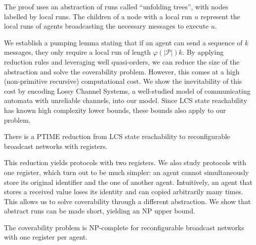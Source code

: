\documentclass{article}
\newcommand{\size}[1]{|#1|}
\newtheorem{lemma}[theorem]{Lemma}
\theoremstyle{definition}
\newtheorem{definition}[theorem]{Definition}
\newtheorem{remark}{Remark}
\begin{document}
The proof uses an abstraction of runs called ``unfolding trees'', with nodes labelled by local runs. The children of a node with a local run $u$ represent the local runs of agents broadcasting the necessary messages to execute $u$.

We establish a pumping lemma stating that if an agent can send a sequence of $k$ messages, they only require a local run of length $\varphi(\size{\mathcal{P}})k$.
By applying reduction rules and leveraging well quasi-orders, we can reduce the size of the abstraction and solve the coverability problem. However, this comes at a high (non-primitive recursive) computational cost. We show the inevitability of this cost by encoding Lossy Channel Systems, a well-studied model of communicating automata with unreliable channels, into our model. Since LCS state reachability has known high complexity lower bounds, these bounds also apply to our problem.
	
	\begin{theorem}
		There is a PTIME reduction from LCS state reachability to reconfigurable broadcast networks with registers.
	\end{theorem}
	
	This reduction yields protocols with two registers.
	We also study protocols with one register, which turn out to be much simpler: an agent cannot simultaneously store its original identifier and the one of another agent. Intuitively, an agent that stores a received value loses its identity and can copied arbitrarily many times.
	This allows us to solve coverability through a different abstraction. We show that abstract runs can be made short, yielding an NP upper bound.
	
	\begin{theorem}
		The coverability problem is NP-complete for reconfigurable broadcast networks with one register per agent.
	\end{theorem}
	
%	
%	
%	
%	
%	
%	
%	
%	
	
	
\end{document}
